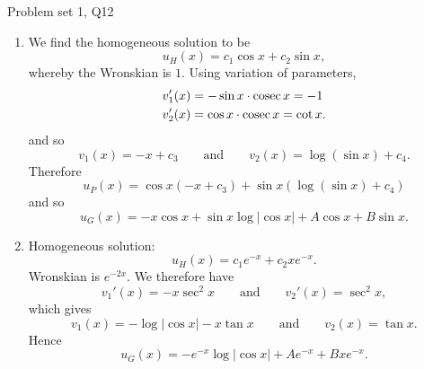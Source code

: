 \begin{problem}{Problem set 1, Q12}{}
\begin{enumerate}
        Hence
            $$ u_P(x) = e^x \bigl[ c_3 + \log(1 + e^x) - x \bigr]
                + e^{-x} \bigl[ c_4 - \log(1 + e^x) \bigr] - 1 , $$
        and of course $u_G(x) = u_P(x) + u_H(x)$.
        \item {} We find the homogeneous solution to be
            $$ u_H(x) = c_1 \cos x + c_2 \sin x , $$
        whereby the Wronskian is $1$. Using variation of parameters,
            \begin{align*}
                v_1'(x) &= -\sin x \cdot \operatorname{cosec} x = -1 \\
                v_2'(x) &= \cos x \cdot \operatorname{cosec} x = \cot x .
            \end{align*}
        and so
            $$ v_1(x) = -x + c_3 \qquad \text{and} \qquad
                v_2(x) = \log(\sin x) + c_4 . $$
        Therefore
            $$ u_P(x) = \cos x (-x + c_3) +
                \sin x (\log(\sin x) + c_4) $$
        and so
            $$ u_G(x) = -x \cos x + \sin x \log \lvert \cos x \rvert
                + A \cos x + B \sin x . $$
        \item {} Homogeneous solution:
            $$ u_H(x) = c_1 e^{-x} + c_2 x e^{-x} . $$
        Wronskian is $e^{-2x}$. We therefore have
            $$ v_1'(x) = -x \sec^2 x 
                \qquad \text{and} \qquad
                v_2'(x) = \sec^2 x , $$
        which gives
            $$ v_1(x) = -\log \lvert \cos x \rvert - x \tan x
                \qquad \text{and} \qquad
                v_2(x) = \tan x . $$
        Hence
            $$ u_G(x) = -e^{-x} \log \lvert \cos x \rvert 
                + Ae^{-x} + Bxe^{-x} . $$
    \end{enumerate}

\end{problem}

  